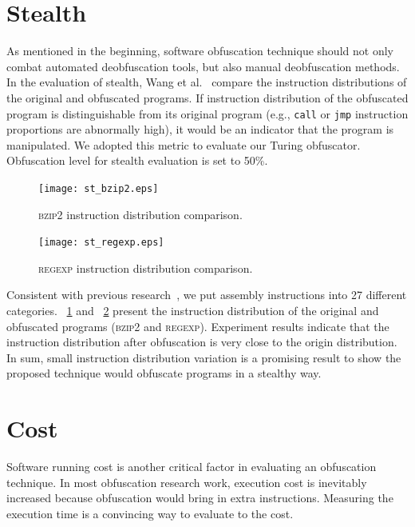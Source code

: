 \section{Stealth}
As mentioned in the beginning, software obfuscation technique should not only
combat automated deobfuscation tools, but also manual deobfuscation methods. In
the evaluation of stealth, Wang et al.~\cite{Trans} compare the instruction
distributions of the original and obfuscated programs. If instruction
distribution of the obfuscated program is distinguishable from its original
program (e.g., \texttt{call} or \texttt{jmp} instruction proportions are
abnormally high), it would be an indicator that the program is manipulated. We
adopted this metric to evaluate our Turing obfuscator. Obfuscation level for
stealth evaluation is set to 50\%.

\begin{figure}
  \texttt{[image: st\_bzip2.eps]}
  \caption{\textsc{bzip2} instruction distribution comparison.}
  \label{fig:bzip2}
\end{figure}

\begin{figure}
  \texttt{[image: st\_regexp.eps]}
  \caption{\textsc{regexp} instruction distribution comparison.}
  \label{fig:regexp}
\end{figure}

Consistent with previous research~\cite{Trans}, we put assembly instructions
into 27 different categories. \F~\ref{fig:bzip2} and \F~\ref{fig:regexp} present
the instruction distribution of the original and obfuscated programs
(\textsc{bzip2} and \textsc{regexp}). Experiment results indicate that the
instruction distribution after obfuscation is very close to the origin
distribution.
In sum, small instruction distribution variation is a promising result to show
the proposed technique would obfuscate programs in a stealthy way.

\section{Cost}
Software running cost is another critical factor in evaluating an obfuscation
technique. In most obfuscation research work, execution cost is inevitably
increased because obfuscation would bring in extra instructions. Measuring the
execution time is a convincing way to evaluate to the cost.

